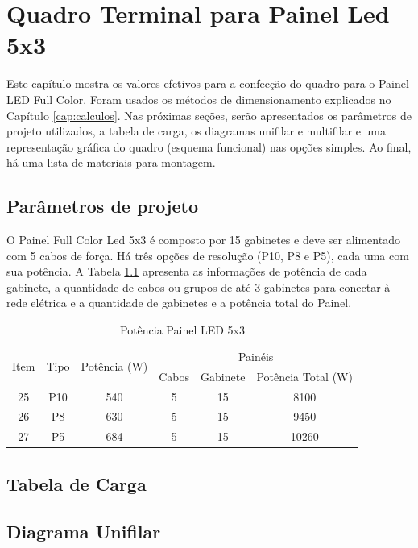 \chapter{Quadro Terminal para Painel Led 5x3}

Este capítulo mostra os valores efetivos para a confecção do quadro para o Painel LED Full Color. Foram usados os métodos de dimensionamento explicados no Capítulo \ref{cap:calculos}. Nas próximas seções, serão apresentados os parâmetros de projeto utilizados, a tabela de carga, os diagramas unifilar e multifilar e uma representação gráfica do quadro (esquema funcional) nas opções simples. Ao final, há uma lista de materiais para montagem.

\section{Parâmetros de projeto}

O Painel Full Color Led 5x3 é composto por 15 gabinetes e deve ser alimentado com 5 cabos de força. Há três opções de resolução (P10, P8 e P5), cada uma com sua potência. A Tabela \ref{tab:pot_5x3} apresenta as informações de potência de cada gabinete, a quantidade de cabos ou grupos de até 3 gabinetes para conectar à rede elétrica e a quantidade de gabinetes e a potência total do Painel.

\begin{table}[htbp]
\caption{Potência Painel LED 5x3}
\centering
\begin{tabular}{cccccc}
\toprule
\multirow{2}{*}{Item} & \multirow{2}{*}{Tipo} & \multirow{2}{*}{Potência (W)} & \multicolumn{3}{c}{Painéis} \\
\cmidrule{4-6}
& & & Cabos  & Gabinete & Potência Total (W) \\
\midrule


25 & P10 & 540 & 5 & 15 & 8100 \\
26 & P8 & 630 & 5 & 15 & 9450 \\
27 & P5 & 684 & 5 & 15 & 10260 \\


\bottomrule
\end{tabular}
\label{tab:pot_5x3}
\end{table}


\section{Tabela de Carga}
\section{Diagrama Unifilar}

